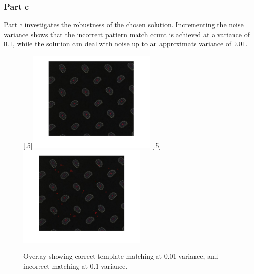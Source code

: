\documentclass[a4paper]{article}
\begin{document}
	\subsubsection{Part c}
	\par Part c investigates the robustness of the chosen solution.
	Incrementing the noise variance shows that the incorrect pattern match
	count is achieved at a variance of 0.1, while the solution can deal with
	noise up to an approximate variance of 0.01.
	\begin{figure}[H]
		\centering
		[.5\linewidth]{\includegraphics[height=5cm]{Results/Q3/c/qcOverlay001.jpg}}%
		[.5\linewidth]{\includegraphics[height=5cm]{Results/Q3/c/qcOverlay01.jpg}}%
		\caption{Overlay showing correct template matching at 0.01
		variance, and incorrect matching at 0.1 variance.}
		\label{fig:}
	\end{figure}
\end{document}
